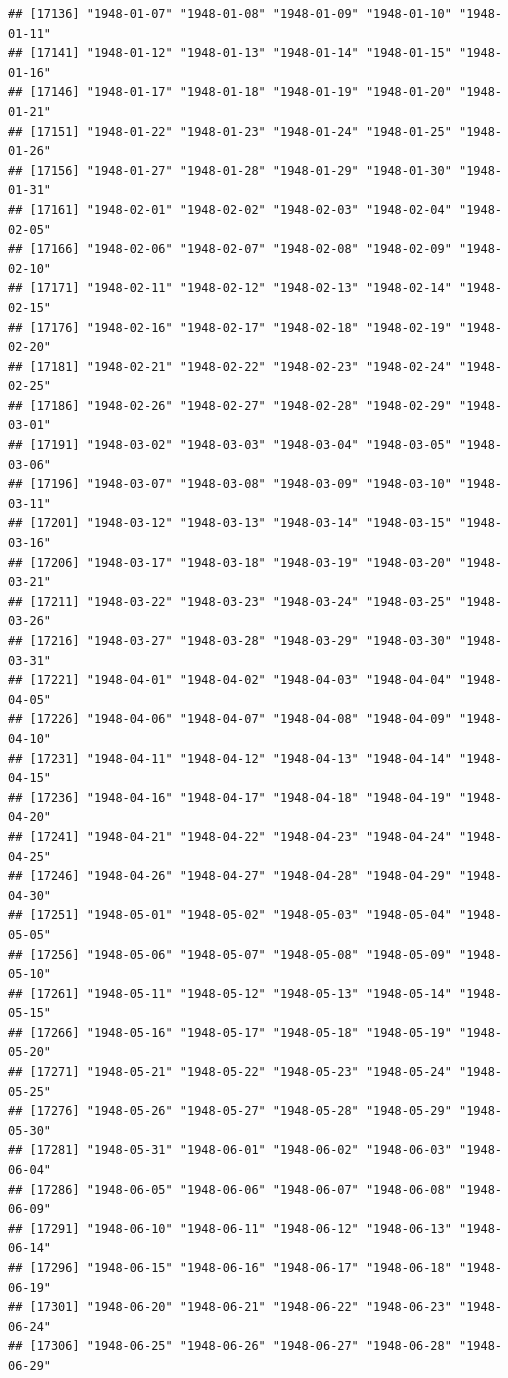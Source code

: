 \documentclass{article}\usepackage[]{graphicx}\usepackage[]{color}
\makeatletter
\newenvironment{kframe}{%
 \def\at@end@of@kframe{}%
 \ifinner\ifhmode%
  \def\at@end@of@kframe{\end{minipage}}%
  \begin{minipage}{\columnwidth}%
 \fi\fi%
 \def\FrameCommand##1{\hskip\@totalleftmargin \hskip-\fboxsep
 \colorbox{shadecolor}{##1}\hskip-\fboxsep
     \hskip-\linewidth \hskip-\@totalleftmargin \hskip\columnwidth}%
 \MakeFramed {\advance\hsize-\width
   \@totalleftmargin\z@ \linewidth\hsize
   \@setminipage}}%
 {\par\unskip\endMakeFramed%
 \at@end@of@kframe}
\newenvironment{knitrout}{}{} %
\makeatother
\begin{document}
\begin{description}
\begin{knitrout}
\begin{kframe}
\begin{verbatim}
## [17136] "1948-01-07" "1948-01-08" "1948-01-09" "1948-01-10" "1948-01-11"
## [17141] "1948-01-12" "1948-01-13" "1948-01-14" "1948-01-15" "1948-01-16"
## [17146] "1948-01-17" "1948-01-18" "1948-01-19" "1948-01-20" "1948-01-21"
## [17151] "1948-01-22" "1948-01-23" "1948-01-24" "1948-01-25" "1948-01-26"
## [17156] "1948-01-27" "1948-01-28" "1948-01-29" "1948-01-30" "1948-01-31"
## [17161] "1948-02-01" "1948-02-02" "1948-02-03" "1948-02-04" "1948-02-05"
## [17166] "1948-02-06" "1948-02-07" "1948-02-08" "1948-02-09" "1948-02-10"
## [17171] "1948-02-11" "1948-02-12" "1948-02-13" "1948-02-14" "1948-02-15"
## [17176] "1948-02-16" "1948-02-17" "1948-02-18" "1948-02-19" "1948-02-20"
## [17181] "1948-02-21" "1948-02-22" "1948-02-23" "1948-02-24" "1948-02-25"
## [17186] "1948-02-26" "1948-02-27" "1948-02-28" "1948-02-29" "1948-03-01"
## [17191] "1948-03-02" "1948-03-03" "1948-03-04" "1948-03-05" "1948-03-06"
## [17196] "1948-03-07" "1948-03-08" "1948-03-09" "1948-03-10" "1948-03-11"
## [17201] "1948-03-12" "1948-03-13" "1948-03-14" "1948-03-15" "1948-03-16"
## [17206] "1948-03-17" "1948-03-18" "1948-03-19" "1948-03-20" "1948-03-21"
## [17211] "1948-03-22" "1948-03-23" "1948-03-24" "1948-03-25" "1948-03-26"
## [17216] "1948-03-27" "1948-03-28" "1948-03-29" "1948-03-30" "1948-03-31"
## [17221] "1948-04-01" "1948-04-02" "1948-04-03" "1948-04-04" "1948-04-05"
## [17226] "1948-04-06" "1948-04-07" "1948-04-08" "1948-04-09" "1948-04-10"
## [17231] "1948-04-11" "1948-04-12" "1948-04-13" "1948-04-14" "1948-04-15"
## [17236] "1948-04-16" "1948-04-17" "1948-04-18" "1948-04-19" "1948-04-20"
## [17241] "1948-04-21" "1948-04-22" "1948-04-23" "1948-04-24" "1948-04-25"
## [17246] "1948-04-26" "1948-04-27" "1948-04-28" "1948-04-29" "1948-04-30"
## [17251] "1948-05-01" "1948-05-02" "1948-05-03" "1948-05-04" "1948-05-05"
## [17256] "1948-05-06" "1948-05-07" "1948-05-08" "1948-05-09" "1948-05-10"
## [17261] "1948-05-11" "1948-05-12" "1948-05-13" "1948-05-14" "1948-05-15"
## [17266] "1948-05-16" "1948-05-17" "1948-05-18" "1948-05-19" "1948-05-20"
## [17271] "1948-05-21" "1948-05-22" "1948-05-23" "1948-05-24" "1948-05-25"
## [17276] "1948-05-26" "1948-05-27" "1948-05-28" "1948-05-29" "1948-05-30"
## [17281] "1948-05-31" "1948-06-01" "1948-06-02" "1948-06-03" "1948-06-04"
## [17286] "1948-06-05" "1948-06-06" "1948-06-07" "1948-06-08" "1948-06-09"
## [17291] "1948-06-10" "1948-06-11" "1948-06-12" "1948-06-13" "1948-06-14"
## [17296] "1948-06-15" "1948-06-16" "1948-06-17" "1948-06-18" "1948-06-19"
## [17301] "1948-06-20" "1948-06-21" "1948-06-22" "1948-06-23" "1948-06-24"
## [17306] "1948-06-25" "1948-06-26" "1948-06-27" "1948-06-28" "1948-06-29"

\end{verbatim}
\end{kframe}
\end{knitrout}
\end{description}
\end{document}
